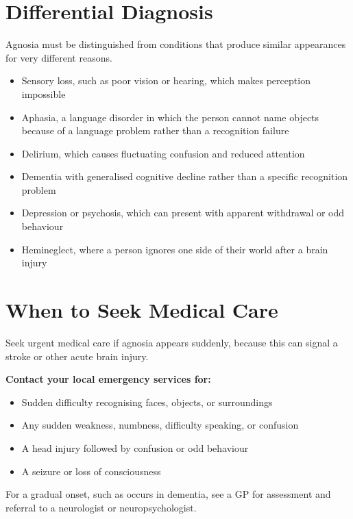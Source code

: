 \section*{Differential Diagnosis}
Agnosia must be distinguished from conditions that produce similar appearances for very different reasons.

\begin{itemize}
    \item Sensory loss, such as poor vision or hearing, which makes perception impossible
    \item Aphasia, a language disorder in which the person cannot name objects because of a language problem rather than a recognition failure
    \item Delirium, which causes fluctuating confusion and reduced attention
    \item Dementia with generalised cognitive decline rather than a specific recognition problem
    \item Depression or psychosis, which can present with apparent withdrawal or odd behaviour
    \item Hemineglect, where a person ignores one side of their world after a brain injury
\end{itemize}

\section*{When to Seek Medical Care}
Seek urgent medical care if agnosia appears suddenly, because this can signal a stroke or other acute brain injury.

\textbf{Contact your local emergency services for:}
\begin{itemize}
    \item Sudden difficulty recognising faces, objects, or surroundings
    \item Any sudden weakness, numbness, difficulty speaking, or confusion
    \item A head injury followed by confusion or odd behaviour
    \item A seizure or loss of consciousness
\end{itemize}

For a gradual onset, such as occurs in dementia, see a GP for assessment and referral to a neurologist or neuropsychologist.

